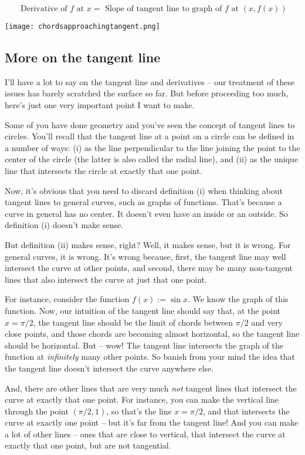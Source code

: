 \documentclass[10pt]{amsart}
\begin{document}
\begin{equation*}
  \text{ Derivative of $f$ at $x$} = \text{ Slope of tangent line to graph of $f$ at $(x,f(x))$}
\end{equation*}

\texttt{[image: chordsapproachingtangent.png]}

\subsection{More on the tangent line}

I'll have a lot to say on the tangent line and derivatives -- our
treatment of these issues has barely scratched the surface so far. But
before proceeding too much, here's just one very important point I
want to make.

Some of you have done geometry and you've seen the concept of tangent
lines to circles. You'll recall that the tangent line at a point on a
circle can be defined in a number of ways: (i) as the line
perpendicular to the line joining the point to the center of the
circle (the latter is also called the radial line), and (ii) as the
unique line that intersects the circle at exactly that one point.

Now, it's obvious that you need to discard definition (i) when
thinking about tangent lines to general curves, such as graphs of
functions. That's because a curve in general has no center. It doesn't
even have an inside or an outside. So definition (i) doesn't make sense.

But definition (ii) makes sense, right? Well, it makes sense, but it
is wrong. For general curves, it is wrong. It's wrong because, first,
the tangent line may well intersect the curve at other points, and
second, there may be many non-tangent lines that also intersect the
curve at just that one point.

For instance, consider the function $f(x) := \sin x$. We know the
graph of this function. Now, our intuition of the tangent line should
say that, at the point $x = \pi/2$, the tangent line should be the
limit of chords between $\pi/2$ and very close points, and those
chords are becoming almost horizontal, so the tangent line should be
horizontal. But -- wow! The tangent line intersects the graph of the
function at {\em infinitely} many other points. So banish from your
mind the idea that the tangent line doesn't intersect the curve
anywhere else.

And, there are other lines that are very much {\em not} tangent lines
that intersect the curve at exactly that one point. For instance, you
can make the vertical line through the point $(\pi/2,1)$, so that's the
line $x = \pi/2$, and that intersects the curve at exactly one point
-- but it's far from the tangent line! And you can make a lot of other
lines -- ones that are close to vertical, that intersect the curve at
exactly that one point, but are not tangential.
\end{document}
